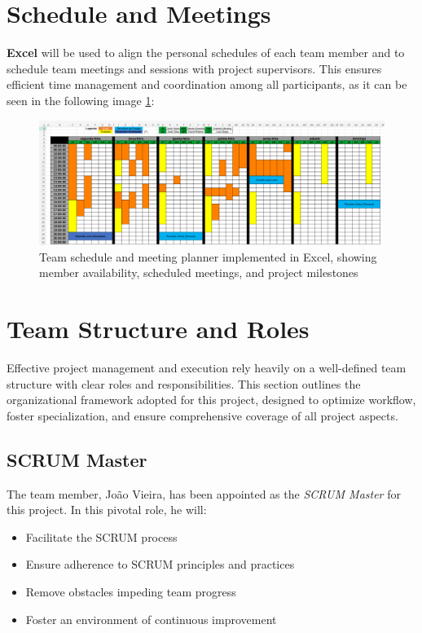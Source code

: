 \section{Schedule and Meetings}
\label{section:schedule_meetings}
\textbf{Excel} will be used to align the personal schedules of each team member and to schedule team meetings and sessions with project supervisors. This ensures efficient time management and coordination among all participants, as it can be seen in the following image \ref{fig:schedule}:

\begin{figure}[H]
      \centering
      \includegraphics[width=16cm]{figs/team_schedule.png}
      \caption{Team schedule and meeting planner implemented in Excel, showing member availability, scheduled meetings, and project milestones}
      \label{fig:schedule}
\end{figure}

\section{Team Structure and Roles}
\label{section:team_structure} 

Effective project management and execution rely heavily on a well-defined team structure with clear roles and responsibilities. This section outlines the organizational framework adopted for this project, designed to optimize workflow, foster specialization, and ensure comprehensive coverage of all project aspects. 

\subsection{SCRUM Master}
\label{subsec:scrum_master} 
The team member, João Vieira, has been appointed as the \textit{SCRUM Master} for this project. In this pivotal role, he will: 

\begin{itemize}
    \item Facilitate the SCRUM process
    \item Ensure adherence to SCRUM principles and practices
    \item Remove obstacles impeding team progress
    \item Foster an environment of continuous improvement
\end{itemize} 

